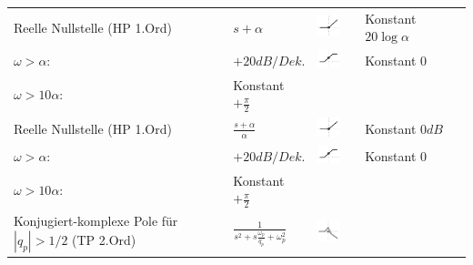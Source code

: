\begin{landscape}
\begin{longtable}{|p{5cm}|l|ll|ll|}
		Reelle Nullstelle (HP 1.Ord) &
		$s + \alpha$ & 
		\parbox[c][1cm]{1cm}{\includegraphics[width=1cm]{Images/bode-approx-ampl-5.png}} &
		\begin{tabular}{ll}
			$\omega < \alpha$: & Konstant $20 \log \alpha$ \\
			$\omega > \alpha$: & $+20dB/Dek.$
		\end{tabular} & 
		\parbox[c][1cm]{1cm}{\includegraphics[width=1cm]{Images/bode-approx-phase-5.png}}	&
		\begin{tabular}{ll}
			$\omega < \frac{\alpha}{10}$: & Konstant $0$ \\
			$\omega > 10 \alpha$: & Konstant $+\frac{\pi}{2}$
		\end{tabular}
		\\ \hline	
		Reelle Nullstelle (HP 1.Ord) &
		$\frac{s + \alpha}{\alpha}$ &
		\parbox[c][1cm]{1cm}{\includegraphics[width=1cm]{Images/bode-approx-ampl-5.png}} &
		\begin{tabular}{ll}
			$\omega < \alpha$: & Konstant $0dB$ \\
			$\omega > \alpha$: & $+20dB/Dek.$
		\end{tabular} &
		\parbox[c][1cm]{1cm}{\includegraphics[width=1cm]{Images/bode-approx-phase-5.png}} &
		\begin{tabular}{ll}
			$\omega < \frac{\alpha}{10}$: & Konstant $0$ \\
			$\omega > 10 \alpha$: & Konstant $+\frac{\pi}{2}$
		\end{tabular}
		\\ \hline
		Konjugiert-komplexe Pole \newline
		für $|q_p| > 1/2$ (TP 2.Ord) &
		$\frac{1}{s^2+s\frac{\omega_p}{q_p}+\omega_p^2}$ &
		\parbox[c][1cm]{1cm}{\includegraphics[width=1cm]{Images/bode-approx-ampl-6.png}} &
		\begin{tabular}{ll}

\end{tabular}
\end{longtable}
\end{landscape}
